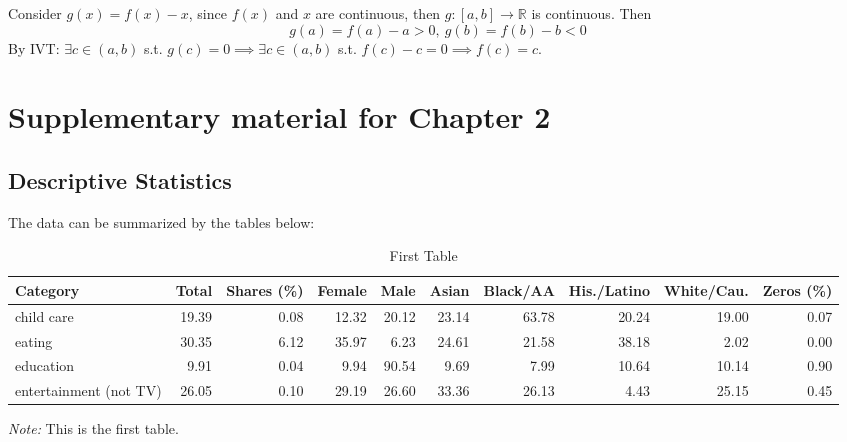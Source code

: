 \documentclass[letterpaper]{report}
\begin{document}
\begin{appendices}
  \begin{framed}
    Consider $g(x)=f(x)-x$, since $f(x)$ and $x$ are continuous, then $g:[a,b]\to\mathbb{R}$ is continuous. Then
    $$g(a)=f(a)-a>0, \ g(b)=f(b)-b<0$$
    By IVT: $\exists c\in(a,b)$ s.t. $g(c)=0\implies \exists c\in(a,b)$ s.t. $f(c)-c=0\implies f(c)=c.$
  \end{framed}
  
  \chapter{Supplementary material for Chapter 2}
  
  \setcounter{table}{0}
  
  \section{Descriptive Statistics}
  
  The data can be summarized by the tables below:
  
  \renewcommand*\arraystretch{0.95}
  \renewcommand{\tabcolsep}{6pt}
  \begin{table}[H]
    \renewcommand{\thetable}{B.\arabic{table}a}
    \caption{First Table}
    \label{summary_a}
    \fontsize{9}{11}\selectfont
    \hspace*{-0.5cm}
    \begin{tabular}{lrrrrrrrrr}
      \toprule
      Category                   & Total & Shares (\%) & Female & Male  & Asian & Black/AA & His./Latino & White/Cau. & Zeros (\%) \\ \hline
      child care                 & 19.39 & 0.08   & 12.32  & 20.12 & 23.14 & 63.78    & 20.24       & 19.00      & 0.07  \\
      eating                     & 30.35 & 6.12   & 35.97  & 6.23 & 24.61 & 21.58    & 38.18       & 2.02      & 0.00  \\
      education                  & 9.91  & 0.04   & 9.94   & 90.54  & 9.69  & 7.99     & 10.64        & 10.14      & 0.90  \\
      entertainment (not TV)     & 26.05 & 0.10   & 29.19  & 26.60 & 33.36 & 26.13    & 4.43       & 25.15      & 0.45  \\ \bottomrule
    \end{tabular}
    \hspace*{-1cm}
    \begin{minipage}{1.065\textwidth}
      \onehalfspacing
      \vspace*{0.05cm}
      \begin{tablenotes}
        \footnotesize
        \item\textit{Note:} This is the first table.
      \end{tablenotes}
    \end{minipage}
  \end{table}
  

\end{appendices}
\end{document}
